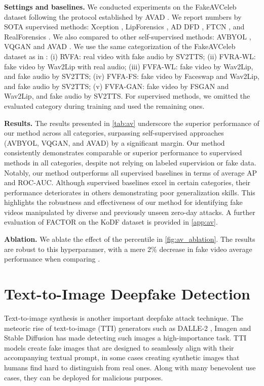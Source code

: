 \documentclass{article} \usepackage{iclr2024_conference,times}
\begin{document}
\textbf{Settings and baselines.} We conducted experiments on the FakeAVCeleb dataset \citep{fakeavceleb} following the protocol established by AVAD \citep{owens}. We report numbers by SOTA supervised methods: Xception \citep{learning3_ff++}, LipForensics \citep{lip_forensics}, AD DFD \citep{AD_DFD}, FTCN \citep{ftcn}, and RealForensics \citep{real_forensics}. We also compared to other self-supervised methods: AVBYOL \citep{byol,real_forensics}, VQGAN \citep{vqgan} and AVAD \citep{owens}. We use the same categorization of the FakeAVCeleb dataset as in \citet{owens}: (i) RVFA: real video with fake audio by SV2TTS; (ii) FVRA-WL: fake video by Wav2Lip with real audio; (iii) FVFA-WL: fake video by Wav2Lip, and fake audio by SV2TTS; (iv) FVFA-FS: fake video by Faceswap and Wav2Lip, and fake audio by SV2TTS; (v) FVFA-GAN: fake video by FSGAN and Wav2Lip, and fake audio by SV2TTS. For supervised methods, we omitted the evaluated category during training and used the remaining ones.

\textbf{Results.} The results presented in \cref{tab:av} underscore the superior performance of our method across all categories, surpassing self-supervised approaches (AVBYOL, VQGAN, and AVAD) by a significant margin. Our method consistently demonstrates comparable or superior performance to supervised methods in all categories, despite not relying on labeled supervision or fake data. Notably, our method outperforms all supervised baselines in terms of average AP and ROC-AUC. Although supervised baselines excel in certain categories, their performance deteriorates in others demonstrating poor generalization skills. This highlights the robustness and effectiveness of our method for identifying fake videos manipulated by diverse and previously unseen zero-day attacks. A further evaluation of FACTOR on the KoDF \citep{kodf} dataset is provided in \cref{app:av}.

\textbf{Ablation.} We ablate the effect of the percentile  in \cref{fig:av_ablation}. The results are robust to this hyperparamer, with a mere 2\% decrease in fake video average performance when comparing . 


\section{Text-to-Image Deepfake Detection}
\label{sec:text-to-image}

Text-to-image synthesis is another important deepfake attack technique. The meteoric rise of text-to-image (TTI) generators such as DALLE-2 \citep{dalle-2}, Imagen \citep{imagen} and Stable Diffusion \citep{stable_diffusion} has made detecting such images a high-importance task. TTI models create fake images that are designed to seamlessly align with their accompanying textual prompt, in some cases creating synthetic images that humans find hard to distinguish from real ones. Along with many benevolent use cases, they can be deployed for malicious purposes.
\end{document}
